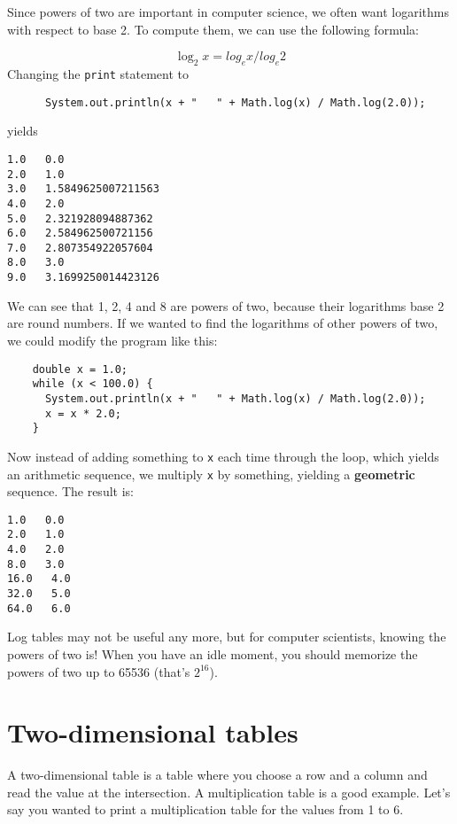 \documentclass[12pt]{book}
\theoremstyle{definition}
\begin{document}
Since powers of two are important
in computer science, we often want logarithms with
respect to base 2.  To compute them, we can use the following
formula:

\begin{equation}
\log_2 x = log_e x / log_e 2
\end{equation}
%
Changing the {\tt print} statement to

\begin{lstlisting}
      System.out.println(x + "   " + Math.log(x) / Math.log(2.0));
\end{lstlisting}
%
yields

\begin{lstlisting}
1.0   0.0
2.0   1.0
3.0   1.5849625007211563
4.0   2.0
5.0   2.321928094887362
6.0   2.584962500721156
7.0   2.807354922057604
8.0   3.0
9.0   3.1699250014423126
\end{lstlisting}
%
We can see that 1, 2, 4 and 8 are powers of two, because
their logarithms base 2 are round numbers.  If we wanted to find
the logarithms of other powers of two, we could modify the
program like this:

\begin{lstlisting}
    double x = 1.0;
    while (x < 100.0) {
      System.out.println(x + "   " + Math.log(x) / Math.log(2.0));
      x = x * 2.0;
    }
\end{lstlisting}
%
Now instead of adding something to {\tt x} each time through
the loop, which yields an arithmetic sequence, we multiply
{\tt x} by something, yielding a {\bf geometric} sequence.
The result is:

\begin{lstlisting}
1.0   0.0
2.0   1.0
4.0   2.0
8.0   3.0
16.0   4.0
32.0   5.0
64.0   6.0
\end{lstlisting}
%
Log tables may not be useful any more, but for computer scientists,
knowing the powers of two is!  When you have an idle
moment, you should memorize the powers of two up to 65536
(that's $2^{16}$).


\section{Two-dimensional tables}

A two-dimensional table is a table where you choose a row and
a column and read the value at the intersection.  A multiplication
table is a good example.  Let's say you wanted to print a
multiplication table for the values from 1 to 6.
\end{document}
